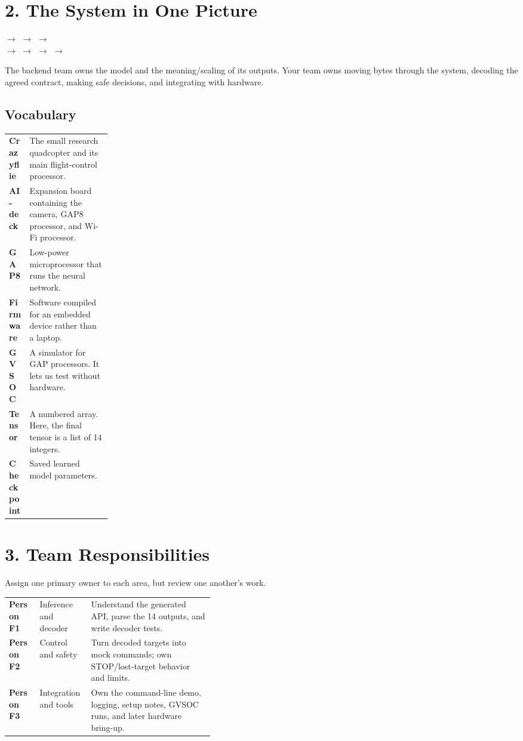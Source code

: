 \documentclass[11pt]{article}
\begin{document}
\section{2. The System in One Picture}

\begin{center}
 $\longrightarrow$
 $\longrightarrow$
 $\longrightarrow$
\\[6pt]
$\longrightarrow$  $\longrightarrow$
 $\longrightarrow$
 $\longrightarrow$
\end{center}

The backend team owns the model and the meaning/scaling of its outputs. Your team owns moving bytes through the system, decoding the agreed contract, making safe decisions, and integrating with hardware.

\subsection{Vocabulary}

\begin{tabularx}{\linewidth}{>{\bfseries}p{0.20\linewidth}X}
Crazyflie & The small research quadcopter and its main flight-control processor. \\
AI-deck & Expansion board containing the camera, GAP8 processor, and Wi-Fi processor. \\
GAP8 & Low-power microprocessor that runs the neural network. \\
Firmware & Software compiled for an embedded device rather than a laptop. \\
GVSOC & A simulator for GAP processors. It lets us test without hardware. \\
Tensor & A numbered array. Here, the final tensor is a list of 14 integers. \\
Checkpoint & Saved learned model parameters. \\
\end{tabularx}

\section{3. Team Responsibilities}

Assign one primary owner to each area, but review one another's work.

\begin{tabularx}{\linewidth}{>{\bfseries}p{0.15\linewidth}p{0.25\linewidth}X}
Person F1 & Inference and decoder & Understand the generated API, parse the 14 outputs, and write decoder tests. \\
Person F2 & Control and safety & Turn decoded targets into mock commands; own STOP/lost-target behavior and limits. \\
Person F3 & Integration and tools & Own the command-line demo, logging, setup notes, GVSOC runs, and later hardware bring-up. \\
\end{tabularx}
\end{document}
